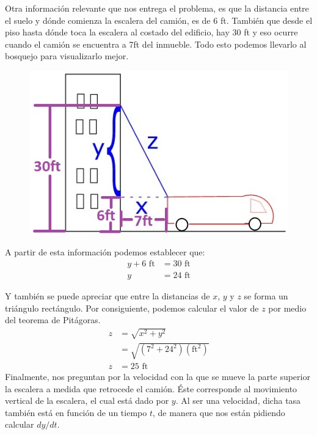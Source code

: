 \documentclass[12pt]{article}
\begin{document}
Otra información relevante que nos entrega el problema, es que la distancia entre el suelo y dónde comienza la escalera del camión, es de 6 ft. También que desde el piso hasta dónde toca la escalera al costado del edificio, hay 30 ft y eso ocurre cuando el camión se encuentra a 7ft del inmueble. Todo esto podemos llevarlo al bosquejo para visualizarlo mejor.

\begin{figure}[hbt!]
\centering
\includegraphics[scale=0.5]{img/related-prob-2b.jpg}
\end{figure}

A partir de esta información podemos establecer que:
\begin{align*}
y + 6 \text{ ft} &= 30 \text{ ft} \\
y &= 24 \text{ ft}
\end{align*}

\newpage

Y también se puede apreciar que entre la distancias de $x$, $y$ y $z$ se forma un triángulo rectángulo. Por consiguiente, podemos calcular el valor de $z$ por medio del teorema de Pitágoras.
\begin{align*}
z &= \sqrt{x^{2} + y^{2}} \\
 &= \sqrt{(7^{2} + 24^{2})(\text{ft}^2)} \\
z &= 25 \text{ ft}
\end{align*}
Finalmente, nos preguntan por la velocidad con la que se mueve la parte superior la escalera a medida que retrocede el camión. Éste corresponde al movimiento vertical de la escalera, el cual está dado por $y$. Al ser una velocidad, dicha tasa también está en función de un tiempo $t$, de manera que nos están pidiendo calcular $dy/dt$.
\end{document}
